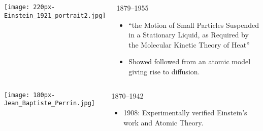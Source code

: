 \begin{frame}

  \begin{columns}
    \texttt{[image: 220px-Einstein\_1921\_portrait2.jpg]}\\
    \begin{block}{
    1879--1955}
    \begin{itemize}
    \item 
       ``the Motion of Small Particles Suspended in a Stationary Liquid, as Required by the Molecular Kinetic Theory of Heat''\cite{einstein1905a,einstein1956a}
    \item 
      Showed  
      followed from an atomic model giving rise to diffusion.
    \end{itemize}
  \end{block}
  \end{columns}

  \medskip

  \begin{columns}
    \texttt{[image: 180px-Jean\_Baptiste\_Perrin.jpg]}\\
    \begin{block}{
        1870--1942}
      \begin{itemize}
      \item 
        1908: Experimentally verified Einstein's work and Atomic Theory.
      \end{itemize}
    \end{block}
  \end{columns}

\end{frame}

